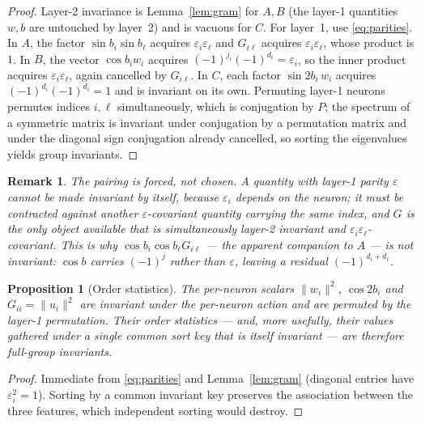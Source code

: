\documentclass[11pt]{article}
\newtheorem{proposition}[theorem]{Proposition}
\newtheorem{remark}[theorem]{Remark}
\begin{document}
\begin{proof}
Layer-2 invariance is Lemma~\ref{lem:gram} for $A,B$ (the layer-1 quantities $w,b$ are untouched by
layer~2) and is vacuous for $C$. For layer~1, use \eqref{eq:parities}. In $A$, the factor
$\sin b_i\sin b_\ell$ acquires $\varepsilon_i\varepsilon_\ell$ and $G_{i\ell}$ acquires
$\varepsilon_i\varepsilon_\ell$, whose product is $1$. In $B$, the vector $\cos b_i w_i$ acquires
$(-1)^{j_i}(-1)^{d_i}=\varepsilon_i$, so the inner product acquires
$\varepsilon_i\varepsilon_\ell$, again cancelled by $G_{i\ell}$. In $C$, each factor
$\sin 2b_i\,w_i$ acquires $(-1)^{d_i}(-1)^{d_i}=1$ and is invariant on its own. Permuting layer-1
neurons permutes indices $i,\ell$ simultaneously, which is conjugation by $P$; the spectrum of a
symmetric matrix is invariant under conjugation by a permutation matrix and under the diagonal sign
conjugation already cancelled, so sorting the eigenvalues yields group invariants.
\end{proof}

\begin{remark}
The pairing is forced, not chosen. A quantity with layer-1 parity $\varepsilon$ cannot be made
invariant by itself, because $\varepsilon_i$ depends on the neuron; it must be contracted against
another $\varepsilon$-covariant quantity carrying the \emph{same} index, and $G$ is the only object
available that is simultaneously layer-2 invariant and $\varepsilon_i\varepsilon_\ell$-covariant.
This is why $\cos b_i\cos b_\ell G_{i\ell}$ --- the apparent companion to $A$ --- is \emph{not}
invariant: $\cos b$ carries $(-1)^{j}$ rather than $\varepsilon$, leaving a residual
$(-1)^{d_i+d_\ell}$.
\end{remark}

\begin{proposition}[Order statistics]
\label{prop:order}
The per-neuron scalars $\|w_i\|^2$, $\cos 2b_i$ and $G_{ii}=\|u_i\|^2$ are invariant under the
per-neuron action and are permuted by the layer-1 permutation. Their order statistics --- and, more
usefully, their values gathered under a single common sort key that is itself invariant --- are
therefore full-group invariants.
\end{proposition}

\begin{proof}
Immediate from \eqref{eq:parities} and Lemma~\ref{lem:gram} (diagonal entries have
$\varepsilon_i^2=1$). Sorting by a common invariant key preserves the association between the three
features, which independent sorting would destroy.
\end{proof}
\end{document}

